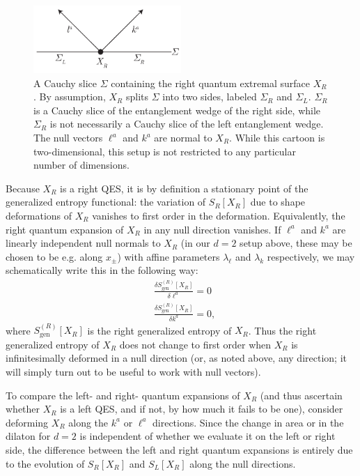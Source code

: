 \documentclass[12pt]{article}
\begin{document}
\begin{figure}
\center
\includegraphics[width=0.5\textwidth]{Decomposition.pdf}
\caption{A Cauchy slice $\Sigma$ containing the right quantum extremal surface $X_{R}$. By assumption, $X_{R}$ splits $\Sigma$ into two sides, labeled $\Sigma_{R}$ and $\Sigma_{L}$. $\Sigma_{R}$ is a Cauchy slice of the entanglement wedge of the right side, while $\Sigma_{R}$ is not necessarily a Cauchy slice of the left entanglement wedge. The null vectors $\ell^{a}$ and $k^{a}$ are normal to $X_{R}$. While this cartoon is two-dimensional, this setup is not restricted to any particular number of dimensions. }
\label{fig:decomp}
\end{figure}

Because $X_{R}$ is a right QES, it is by definition a stationary point of the generalized entropy functional: the variation of $S_{R}[X_{R}]$ due to shape deformations of $X_{R}$ vanishes to first order in the deformation. Equivalently, the right quantum expansion of $X_{R}$ in any null direction vanishes. If $\ell^{a}$ and $k^{a}$ are linearly independent null normals to $X_{R}$ (in our $d=2$ setup above, these may be chosen to be e.g. along $x_{\pm}$) with affine parameters $\lambda_{\ell}$ and $\lambda_{k}$ respectively, we may schematically write this in the following way:
\begin{subequations}
\begin{align}
& \frac{\delta S_{\mathrm{gen}}^{(R)}[X_{R}]}{\delta \ell^{a}}=0\\
& \frac{\delta S_{\mathrm{gen}}^{(R)}[X_{R}]}{\delta k^{a}}=0,
\end{align}
\end{subequations}
where $S_{\mathrm{gen}}^{(R)}[X_{R}]$ is the right generalized entropy of $X_{R}$. Thus the right generalized entropy of $X_{R}$ does not change to first order when $X_{R}$ is infinitesimally deformed in a null direction (or, as noted above, any direction; it will simply turn out to be useful to work with null vectors).


To compare the left- and right- quantum expansions of $X_{R}$ (and thus ascertain whether $X_{R}$ is a left QES, and if not, by how much it fails to be one), consider deforming $X_{R}$ along the $k^{a}$ or $\ell^{a}$ directions. Since the change in area or in the dilaton for $d=2$ is independent of whether we evaluate it on the left or right side, the difference between the left and right quantum expansions is entirely due to the evolution of $S_{R}[X_{R}]$ and $S_{L}[X_{R}]$ along the null directions.
\end{document}
